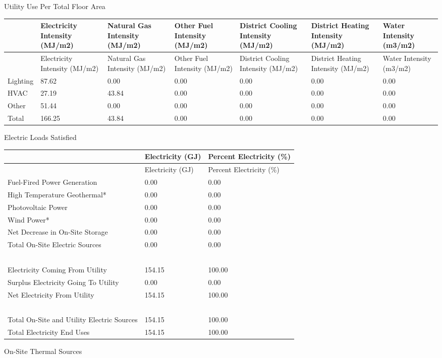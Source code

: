 Utility Use Per Total Floor Area

\begin{longtable}[c]{>{\raggedright}p{0.85in}>{\raggedright}p{0.85in}>{\raggedright}p{0.85in}>{\raggedright}p{0.85in}>{\raggedright}p{0.85in}>{\raggedright}p{0.85in}>{\raggedright}p{0.85in}}
\toprule
~ & Electricity Intensity (MJ/m2) & Natural Gas Intensity (MJ/m2) & Other Fuel Intensity (MJ/m2) & District Cooling Intensity (MJ/m2) & District Heating Intensity (MJ/m2) & Water Intensity (m3/m2) \tabularnewline
\midrule
\endfirsthead

\toprule
~ & Electricity Intensity (MJ/m2) & Natural Gas Intensity (MJ/m2) & Other Fuel Intensity (MJ/m2) & District Cooling Intensity (MJ/m2) & District Heating Intensity (MJ/m2) & Water Intensity (m3/m2) \tabularnewline
\midrule
\endhead

Lighting & 87.62 & 0.00 & 0.00 & 0.00 & 0.00 & 0.00 \tabularnewline
HVAC & 27.19 & 43.84 & 0.00 & 0.00 & 0.00 & 0.00 \tabularnewline
Other & 51.44 & 0.00 & 0.00 & 0.00 & 0.00 & 0.00 \tabularnewline
Total & 166.25 & 43.84 & 0.00 & 0.00 & 0.00 & 0.00 \tabularnewline
\bottomrule
\end{longtable}

Electric Loads Satisfied

\begin{longtable}[c]{>{\raggedright}p{2.9in}>{\raggedright}p{1.5in}>{\raggedright}p{1.59in}}
\toprule
~ & Electricity (GJ) & Percent Electricity (\%) \tabularnewline
\midrule
\endfirsthead

\toprule
~ & Electricity (GJ) & Percent Electricity (\%) \tabularnewline
\midrule
\endhead

Fuel-Fired Power Generation & 0.00 & 0.00 \tabularnewline
High Temperature Geothermal* & 0.00 & 0.00 \tabularnewline
Photovoltaic Power & 0.00 & 0.00 \tabularnewline
Wind Power* & 0.00 & 0.00 \tabularnewline
Net Decrease in On-Site Storage & 0.00 & 0.00 \tabularnewline
Total On-Site Electric Sources & 0.00 & 0.00 \tabularnewline
~ & ~ & ~ \tabularnewline
Electricity Coming From Utility & 154.15 & 100.00 \tabularnewline
Surplus Electricity Going To Utility & 0.00 & 0.00 \tabularnewline
Net Electricity From Utility & 154.15 & 100.00 \tabularnewline
~ & ~ & ~ \tabularnewline
Total On-Site and Utility Electric Sources & 154.15 & 100.00 \tabularnewline
Total Electricity End Uses & 154.15 & 100.00 \tabularnewline
\bottomrule
\end{longtable}

On-Site Thermal Sources

